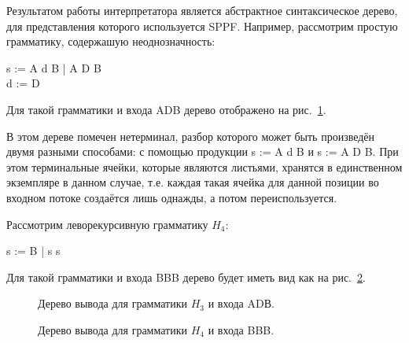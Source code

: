 Результатом работы интерпретатора является абстрактное синтаксическое дерево, для представления которого используется SPPF. Например, рассмотрим простую грамматику, содержашую неоднозначность:

\begin{center}
    s := A d B | A D B
    \\d := D
\end{center}

Для такой грамматики и входа ADB дерево отображено на рис.~\ref{fig8}.

В этом дереве помечен нетерминал, разбор которого может быть произведён двумя разными способами: с помощью продукции s := A d B и s := A D B. При этом терминальные ячейки, которые являются листьями, хранятся в единственном экземпляре в данном случае, т.е. каждая такая ячейка для данной позиции во входном потоке создаётся лишь однажды, а потом переиспользуется.

Рассмотрим леворекурсивную грамматику $H_4$:
\begin{center}
    s := B | s s
\end{center}

Для такой грамматики и входа BBB дерево будет иметь вид как на  рис.~\ref{fig9}.


\begin{figure}[h]
\caption{Дерево вывода для грамматики $H_3$ и входа ADВ.}
\label{fig8}
\end{figure}

\begin{figure}[h]
\caption{Дерево вывода для грамматики $H_4$ и входа BBB.}
\label{fig9}
\end{figure}

